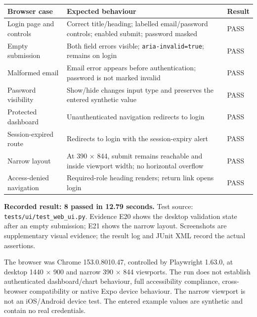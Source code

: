\documentclass[
  11pt,
]{article}
\newcounter{none} %
\begin{document}
{\def\LTcaptype{none} %
\begin{longtable}[]{@{}
  >{\raggedright\arraybackslash}p{}
  >{\raggedright\arraybackslash}p{}
  >{\raggedright\arraybackslash}p{}@{}}
\toprule\noalign{}
\begin{minipage}[b]{\linewidth}\raggedright
Browser case
\end{minipage} & \begin{minipage}[b]{\linewidth}\raggedright
Expected behaviour
\end{minipage} & \begin{minipage}[b]{\linewidth}\raggedright
Result
\end{minipage} \\
\midrule\noalign{}
\endhead
\bottomrule\noalign{}
\endlastfoot
Login page and controls & Correct title/heading; labelled email/password
controls; enabled submit; password masked & PASS \\
Empty submission & Both field errors visible;
\texttt{aria-invalid=true}; remains on login & PASS \\
Malformed email & Email error appears before authentication; password is
not marked invalid & PASS \\
Password visibility & Show/hide changes input type and preserves the
entered synthetic value & PASS \\
Protected dashboard & Unauthenticated navigation redirects to login &
PASS \\
Session-expired route & Redirects to login with the session-expiry alert
& PASS \\
Narrow layout & At 390 × 844, submit remains reachable and inside
viewport width; no horizontal overflow & PASS \\
Access-denied navigation & Required-role heading renders; return link
opens login & PASS \\
\end{longtable}
}

\textbf{Recorded result: 8 passed in 12.79 seconds.} Test source:
\texttt{tests/ui/test\_web\_ui.py}. Evidence E20 shows the desktop
validation state after an empty submission; E21 shows the narrow layout.
Screenshots are supplementary visual evidence; the result log and JUnit
XML record the actual assertions.

The browser was Chrome 153.0.8010.47, controlled by Playwright 1.63.0,
at desktop 1440 × 900 and narrow 390 × 844 viewports. The run does not
establish authenticated dashboard/chart behaviour, full accessibility
compliance, cross-browser compatibility or native Expo device behaviour.
The narrow viewport is not an iOS/Android device test. The entered
example values are synthetic and contain no real credentials.
\end{document}
